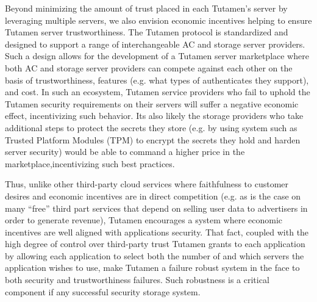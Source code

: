 Beyond minimizing the amount of trust placed in each Tutamen's server
by leveraging multiple servers, we also envision economic incentives
helping to ensure Tutamen server trustworthiness. The Tutamen protocol
is standardized and designed to support a range of interchangeable AC
and storage server providers. Such a design allows for the development
of a Tutamen server marketplace where both AC and storage server
providers can compete against each other on the basis of
trustworthiness, features (e.g. what types of authenticates they
support), and cost. In such an ecosystem, Tutamen service providers
who fail to uphold the Tutamen security requirements on their servers
will suffer a negative economic effect, incentivizing such
behavior. Its also likely the storage providers who take additional
steps to protect the secrets they store (e.g. by using system such as
Trusted Platform Modules (TPM) to encrypt the secrets they hold and
harden server security) would be able to command a higher price in the
marketplace,incentivizing such best practices.

Thus, unlike other third-party cloud services where faithfulness to
customer desires and economic incentives are in direct competition
(e.g. as is the case on many ``free'' third part services that depend
on selling user data to advertisers in order to generate revenue),
Tutamen encourages a system where economic incentives are well aligned
with applications security. That fact, coupled with the high degree of
control over third-party trust Tutamen grants to each application by
allowing each application to select both the number of and which
servers the application wishes to use, make Tutamen a failure robust
system in the face to both security and trustworthiness failures. Such
robustness is a critical component if any successful security storage
system.



